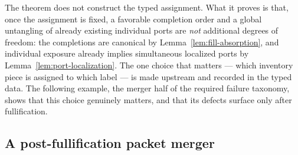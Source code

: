 \documentclass[11pt,reqno]{amsart}
\theoremstyle{definition}
\theoremstyle{remark}
\begin{document}
The theorem does not construct the typed assignment. What it proves is that, once
the assignment is fixed, a favorable completion order and a global untangling of
already existing individual ports are \emph{not} additional degrees of freedom: the
completions are canonical by Lemma~\ref{lem:fill-absorption}, and individual
exposure already implies simultaneous localized ports by
Lemma~\ref{lem:port-localization}. The one choice that matters --- which inventory
piece is assigned to which label --- is made upstream and recorded in the typed
data. The following example, the merger half of the required failure taxonomy, shows
that this choice genuinely matters, and that its defects surface only after
fullification.

\subsection{A post-fullification packet merger}\label{subsec:E-merger}
\end{document}
